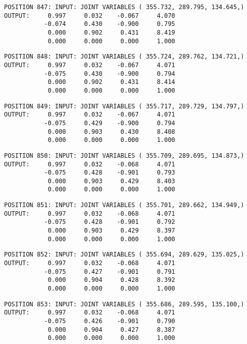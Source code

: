 \begin{verbatim}
POSITION 847: INPUT: JOINT VARIABLES ( 355.732, 289.795, 134.645,)
OUTPUT:     0.997     0.032    -0.067     4.070
           -0.074     0.430    -0.900     0.795
            0.000     0.902     0.431     8.419
            0.000     0.000     0.000     1.000
\end{verbatim} \pagebreak[1]\begin{verbatim}
POSITION 848: INPUT: JOINT VARIABLES ( 355.724, 289.762, 134.721,)
OUTPUT:     0.997     0.032    -0.067     4.071
           -0.075     0.430    -0.900     0.794
            0.000     0.902     0.431     8.414
            0.000     0.000     0.000     1.000
\end{verbatim} \pagebreak[1]\begin{verbatim}
POSITION 849: INPUT: JOINT VARIABLES ( 355.717, 289.729, 134.797,)
OUTPUT:     0.997     0.032    -0.067     4.071
           -0.075     0.429    -0.900     0.794
            0.000     0.903     0.430     8.408
            0.000     0.000     0.000     1.000
\end{verbatim} \pagebreak[1]\begin{verbatim}
POSITION 850: INPUT: JOINT VARIABLES ( 355.709, 289.695, 134.873,)
OUTPUT:     0.997     0.032    -0.068     4.071
           -0.075     0.428    -0.901     0.793
            0.000     0.903     0.429     8.403
            0.000     0.000     0.000     1.000
\end{verbatim} \pagebreak[1]\begin{verbatim}
POSITION 851: INPUT: JOINT VARIABLES ( 355.701, 289.662, 134.949,)
OUTPUT:     0.997     0.032    -0.068     4.071
           -0.075     0.428    -0.901     0.792
            0.000     0.903     0.429     8.397
            0.000     0.000     0.000     1.000
\end{verbatim} \pagebreak[1]\begin{verbatim}
POSITION 852: INPUT: JOINT VARIABLES ( 355.694, 289.629, 135.025,)
OUTPUT:     0.997     0.032    -0.068     4.071
           -0.075     0.427    -0.901     0.791
            0.000     0.904     0.428     8.392
            0.000     0.000     0.000     1.000
\end{verbatim} \pagebreak[1]\begin{verbatim}
POSITION 853: INPUT: JOINT VARIABLES ( 355.686, 289.595, 135.100,)
OUTPUT:     0.997     0.032    -0.068     4.071
           -0.075     0.426    -0.901     0.790
            0.000     0.904     0.427     8.387
            0.000     0.000     0.000     1.000
\end{verbatim} \pagebreak[1]\begin{verbatim}

\end{verbatim}
